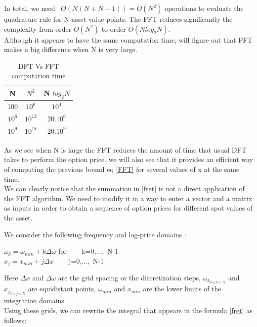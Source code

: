 \documentclass[12pt]{report}
\begin{document}
In total, we need ~$O(N(N+N-1)) = O(N^2)$  operations to evaluate the quadrature rule for N asset value points. The FFT reduces significantly the complexity from order $O(N^2)$ to order $O(N log_2N)$.\\
 Although it appears to  have the same computation time, will figure out that FFT makes  a big difference when N is very large.
\begin {table}[h!]
\begin{center}
 \begin{tabular}{|c |c |c |} 
 \hline
N & $N^2$ & N $log_2 N$ \\ [0.5ex] 
 \hline
 100 & $10^6$ & $10^4$ \\ 
 \hline
 $10^6$ & $10^{12}$ & $20.10^6$ \\
 \hline
 $10^9$ & $10^{18}$ & $20.10^9$  \\
 \hline
\end{tabular}
\end{center}
\caption {DFT Vs FFT computation time }
\end{table}


 As we see when N is large the FFT reduces the amount of time that usual DFT takes to perform the option price. we will also see that it provides an efficient way of computing the previous bound eq \eqref{FFT} for several values of x at the same time.\\

 We can clearly notice that the summation in \eqref{fret} is not a direct application of the FFT algorithm. We need to modify it in a way to enter a vector and a matrix as inputs in order to obtain a sequence of option prices for different spot values of the asset. 

We consider the following frequency and log-price domains :
\begin{center}
$\omega_k=\omega_{min}+k\Delta \omega$ for ~~~ k=0,...,~N-1\\
$x_j=x_{min}+j\Delta x$ ~~~ j=0,...,~N-1
\end{center}


Here $\Delta x$ and $\Delta \omega$ are the grid spacing or the discretization steps,    $\omega_{k_{0\leq k <N }}$ and $x_{j_{0\leq j <N }}$ are equidistant points, $\omega_{min}$ and $x_{min}$ are the lower limits of the integration domains.\\

Using these grids, we can rewrite the integral that appears in the formula \eqref{fret} as follows:
\end{document}
